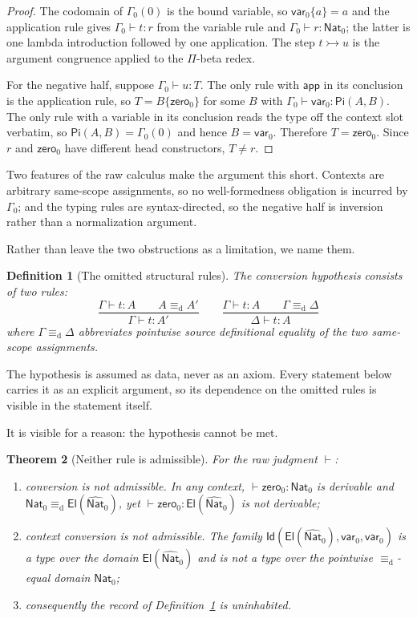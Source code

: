\documentclass[10pt,reqno]{amsart}
\newtheorem{theorem}{Theorem}[section]
\newtheorem{definition}[theorem]{Definition}
\newcommand{\Var}{\mathsf{var}}
\newcommand{\PiTy}{\mathsf{Pi}}
\newcommand{\App}{\mathsf{app}}
\newcommand{\NatTy}{\mathsf{Nat}}
\newcommand{\Zero}{\mathsf{zero}}
\newcommand{\CodeNat}{\widehat{\mathsf{Nat}}}
\newcommand{\El}{\mathsf{El}}
\newcommand{\IdTy}{\mathsf{Id}}
\newcommand{\defeq}{\mathrel{\equiv_{\mathrm d}}}
\newcommand{\ctxred}{\mathrel{\rightarrowtail}}
\begin{document}
\begin{proof}
The codomain of \(\Gamma_0(0)\) is the bound variable, so
\(\Var_0\{a\}=a\) and the application rule gives \(\Gamma_0\vdash t:r\) from the
variable rule and \(\Gamma_0\vdash r:\NatTy_0\); the latter is one lambda
introduction followed by one application.  The step \(t\ctxred u\) is the
argument congruence applied to the \(\Pi\)-beta redex.

For the negative half, suppose \(\Gamma_0\vdash u:T\).  The only rule with
\(\App\) in its conclusion is the application rule, so
\(T=B\{\Zero_0\}\) for some \(B\) with \(\Gamma_0\vdash\Var_0:\PiTy(A,B)\).  The
only rule with a variable in its conclusion reads the type off the context slot
verbatim, so \(\PiTy(A,B)=\Gamma_0(0)\) and hence \(B=\Var_0\).  Therefore
\(T=\Zero_0\).  Since \(r\) and \(\Zero_0\) have different head constructors,
\(T\neq r\).
\end{proof}

Two features of the raw calculus make the argument this short.  Contexts are
arbitrary same-scope assignments, so no well-formedness obligation is incurred
by \(\Gamma_0\); and the typing rules are syntax-directed, so the negative half
is inversion rather than a normalization argument.

Rather than leave the two obstructions as a limitation, we name them.

\begin{definition}[The omitted structural rules]
\label{def:conversion-rules}
The \emph{conversion hypothesis} consists of two rules:
\[
\frac{\Gamma\vdash t:A\qquad A\defeq A'}{\Gamma\vdash t:A'}
\qquad
\frac{\Gamma\vdash t:A\qquad \Gamma\defeq\Delta}
     {\Delta\vdash t:A}
\tag{6.2}\label{eq:conversion-rules}
\]
where \(\Gamma\defeq\Delta\) abbreviates pointwise source definitional
equality of the two same-scope assignments.
\end{definition}

The hypothesis is assumed as data, never as an axiom.  Every statement below
carries it as an explicit argument, so its dependence on the omitted rules is
visible in the statement itself.

It is visible for a reason: the hypothesis cannot be met.

\begin{theorem}[Neither rule is admissible]
\label{thm:not-admissible}
For the raw judgment \(\vdash\):
\begin{enumerate}[label=(\roman*)]
\item conversion is not admissible.  In any context,
  \(\vdash\Zero_0:\NatTy_0\) is derivable and
  \(\NatTy_0\defeq\El(\CodeNat_0)\), yet
  \(\vdash\Zero_0:\El(\CodeNat_0)\) is not derivable;
\item context conversion is not admissible.  The family
  \(\IdTy(\El(\CodeNat_0),\Var_0,\Var_0)\) is a type over the domain
  \(\El(\CodeNat_0)\) and is not a type over the pointwise
  \(\defeq\)-equal domain \(\NatTy_0\);
\item consequently the record of Definition~\ref{def:conversion-rules} is
  uninhabited.
\end{enumerate}
\end{theorem}
\end{document}
